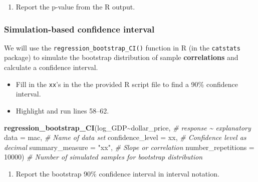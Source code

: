 \documentclass[
]{report}
\newenvironment{Shaded}{\begin{snugshade}}{\end{snugshade}}
\newcommand{\AttributeTok}[1]{\textcolor[rgb]{0.13,0.29,0.53}{#1}}
\newcommand{\CommentTok}[1]{\textcolor[rgb]{0.56,0.35,0.01}{\textit{#1}}}
\newcommand{\DecValTok}[1]{\textcolor[rgb]{0.00,0.00,0.81}{#1}}
\newcommand{\FunctionTok}[1]{\textcolor[rgb]{0.13,0.29,0.53}{\textbf{#1}}}
\newcommand{\NormalTok}[1]{#1}
\newcommand{\SpecialCharTok}[1]{\textcolor[rgb]{0.81,0.36,0.00}{\textbf{#1}}}
\newcommand{\StringTok}[1]{\textcolor[rgb]{0.31,0.60,0.02}{#1}}
\providecommand{\tightlist}{%
  \setlength{\itemsep}{0pt}\setlength{\parskip}{0pt}}
\begin{document}
\begin{enumerate}
\def\labelenumi{\arabic{enumi}.}
\setcounter{enumi}{9}
\tightlist
\item
  Report the p-value from the R output.
  \vspace{0.3in}
\end{enumerate}

\newpage

\subsubsection*{Simulation-based confidence interval}\label{simulation-based-confidence-interval-1}

We will use the \texttt{regression\_bootstrap\_CI()} function in R (in the \texttt{catstats} package) to simulate the bootstrap distribution of sample \textbf{correlations} and calculate a confidence interval.

\begin{itemize}
\item
  Fill in the \texttt{xx}'s in the the provided R script file to find a 90\% confidence interval.
\item
  Highlight and run lines 58--62.
\end{itemize}

\begin{Shaded}
\begin{Highlighting}[]
\FunctionTok{regression\_bootstrap\_CI}\NormalTok{(log\_GDP}\SpecialCharTok{\textasciitilde{}}\NormalTok{dollar\_price, }\CommentTok{\# response \textasciitilde{} explanatory}
   \AttributeTok{data =}\NormalTok{ mac, }\CommentTok{\# Name of data set}
   \AttributeTok{confidence\_level =}\NormalTok{ xx, }\CommentTok{\# Confidence level as decimal}
   \AttributeTok{summary\_measure =} \StringTok{"xx"}\NormalTok{, }\CommentTok{\# Slope or correlation}
   \AttributeTok{number\_repetitions =} \DecValTok{10000}\NormalTok{) }\CommentTok{\# Number of simulated samples for bootstrap distribution}
\end{Highlighting}
\end{Shaded}

\begin{enumerate}
\def\labelenumi{\arabic{enumi}.}
\setcounter{enumi}{10}
\tightlist
\item
  Report the bootstrap 90\% confidence interval in interval notation.\\
  \vspace{0.5in}
\end{enumerate}
\end{document}
